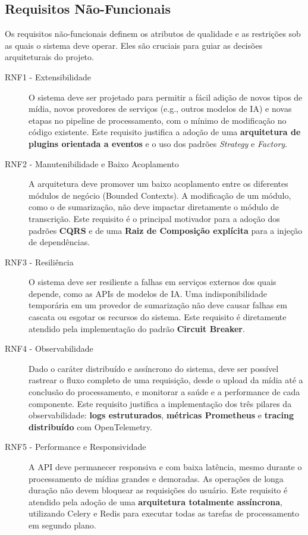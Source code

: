 \subsection{Requisitos Não-Funcionais}
\label{sec:requisitos_nao_funcionais}

Os requisitos não-funcionais definem os atributos de qualidade e as restrições sob as quais o sistema deve operar. Eles são cruciais para guiar as decisões arquiteturais do projeto.

\begin{description}
    \item [RNF1 - Extensibilidade] O sistema deve ser projetado para permitir a fácil adição de novos tipos de mídia, novos provedores de serviços (e.g., outros modelos de IA) e novas etapas no pipeline de processamento, com o mínimo de modificação no código existente. Este requisito justifica a adoção de uma \textbf{arquitetura de plugins orientada a eventos} e o uso dos padrões \textit{Strategy} e \textit{Factory}.

    \item [RNF2 - Manutenibilidade e Baixo Acoplamento] A arquitetura deve promover um baixo acoplamento entre os diferentes módulos de negócio (Bounded Contexts). A modificação de um módulo, como o de sumarização, não deve impactar diretamente o módulo de transcrição. Este requisito é o principal motivador para a adoção dos padrões \textbf{CQRS} e de uma \textbf{Raiz de Composição explícita} para a injeção de dependências.

    \item [RNF3 - Resiliência] O sistema deve ser resiliente a falhas em serviços externos dos quais depende, como as APIs de modelos de IA. Uma indisponibilidade temporária em um provedor de sumarização não deve causar falhas em cascata ou esgotar os recursos do sistema. Este requisito é diretamente atendido pela implementação do padrão \textbf{Circuit Breaker}.

    \item [RNF4 - Observabilidade] Dado o caráter distribuído e assíncrono do sistema, deve ser possível rastrear o fluxo completo de uma requisição, desde o upload da mídia até a conclusão do processamento, e monitorar a saúde e a performance de cada componente. Este requisito justifica a implementação dos três pilares da observabilidade: \textbf{logs estruturados}, \textbf{métricas Prometheus} e \textbf{tracing distribuído} com OpenTelemetry.

    \item [RNF5 - Performance e Responsividade] A API deve permanecer responsiva e com baixa latência, mesmo durante o processamento de mídias grandes e demoradas. As operações de longa duração não devem bloquear as requisições do usuário. Este requisito é atendido pela adoção de uma \textbf{arquitetura totalmente assíncrona}, utilizando Celery e Redis para executar todas as tarefas de processamento em segundo plano.


\end{description}
